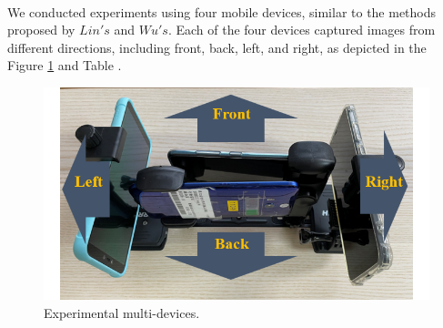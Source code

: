 \documentclass[a4paper,12pt]{report}
\begin{document}
\paragraph{}
We conducted experiments using four mobile devices, similar to the methods proposed by $Lin's$ and $Wu's$. Each of the four devices captured images from different directions, including front, back, left, and right, as depicted in the Figure \ref{Fig:devices} and Table .
\begin{figure}[h]
    \centering
    \includegraphics[width=0.8\columnwidth]{images/chap5-2/device.png}
    \caption{Experimental multi-devices.}
    \label{Fig:devices}
\end{figure}
\end{document}
